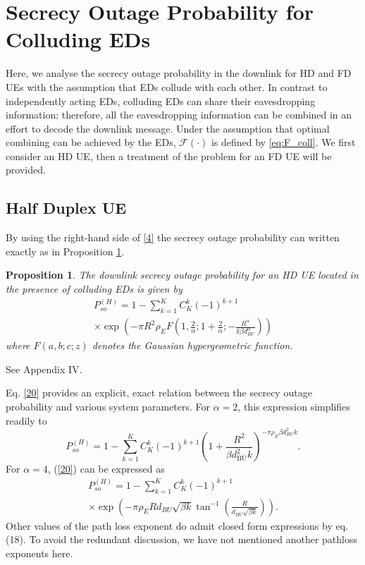 \documentclass[10pt]{IEEEtran}
\newtheorem{prop}[thm]{Proposition}
\begin{document}
\section{Secrecy Outage Probability for Colluding EDs} \label{se:IV}

Here, we analyse the secrecy outage probability in the downlink for HD and FD UEs with the assumption that EDs collude with each other. In contrast to independently acting EDs, colluding EDs can share their eavesdropping information; therefore, all the eavesdropping information can be combined in an effort to decode the downlink message. Under the assumption that optimal combining can be achieved by the EDs, $\mathcal{F}(\cdot)$ is defined by \eqref{eq:F_coll}. We first consider an HD UE, then a treatment of the problem for an FD UE will be provided.

\subsection{Half Duplex UE}
By using the right-hand side of \eqref{4} the secrecy outage probability can written exactly as in Proposition \ref{prop3}.

\begin{prop}\label{prop3}
   The downlink secrecy outage probability for an HD UE located in the presence of colluding EDs is given by
\begin{multline}\label{20}
P^{(H)}_{so} =1 - \sum^K_{k=1}C^k_K(-1)^{k+1}\\
\times \exp\!\left(-\pi R^2\rho_E F\!\left(1,\frac{2}{\alpha};1+\frac{2}{\alpha};-\frac{R^\alpha}{k\beta d_{BU}^\alpha}\right)\right)
\end{multline}
where $F(a,b;c;z)$ denotes the Gaussian hypergeometric function.
\end{prop}
\begin{IEEEproof}
See Appendix IV.
\end{IEEEproof}

Eq. \eqref{20} provides an explicit, exact relation between the secrecy outage probability and various system parameters.  For $\alpha = 2$, this expression simplifies readily to
\begin{equation}
  P^{(H)}_{so} =1 - \sum^K_{k=1}C^k_K(-1)^{k+1} \left(1+\frac{R^2}{\beta d_{\text{BU}}^2 k}\right)^{-\pi \rho_E  \beta d_{{BU}}^2 k}.
\end{equation}
For $\alpha = 4$, (\ref{20}) can be expressed as
\begin{multline}
  P^{(H)}_{so} =1 - \sum^K_{k=1}C^k_K(-1)^{k+1} \\
  \times\exp\!\left({-\pi  \rho_E R  d_{{BU}} \sqrt{\beta k}  \tan ^{-1}\left(\frac{R}{d_{BU}\sqrt{\beta k} }\right)}\right).
\end{multline}
Other values of the path loss exponent do admit closed form expressions by eq. (18). To avoid the redundant discussion, we have not mentioned another pathloss exponents here.
\end{document}
